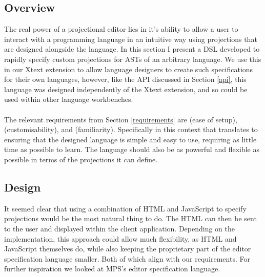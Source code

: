 \documentclass{article}
\begin{document}
\subsection{Overview}
The real power of a projectional editor lies in it's ability to allow a user to interact with a programming language in an intuitive way using projections that are designed alongside the language. In this section I present a DSL developed to rapidly specify custom projections for ASTs of an arbitrary language. We use this in our Xtext extension to allow language designers to create such specifications for their own languages, however, like the API discussed in Section \ref{api}, this language was designed independently of the Xtext extension, and so could be used within other language workbenches.
\\
\\
The relevant requirements from Section \ref{requirements} are \RSetup (ease of setup), \RCustom (customisability), and \RFamiliarity (familiarity). Specifically in this context that translates to ensuring that the designed language is simple and easy to use, requiring as little time as possible to learn. The language should also be as powerful and flexible as possible in terms of the projections it can define.

\subsection{Design}

It seemed clear that using a combination of HTML and JavaScript to specify projections would be the most natural thing to do. The HTML can then be sent to the user and displayed within the client application. Depending on the implementation, this approach could allow much flexibility, as HTML and JavaScript themselves do, while also keeping the proprietary part of the editor specification language smaller. Both of which align with our requirements. For further inspiration we looked at MPS's editor specification language.
\end{document}
